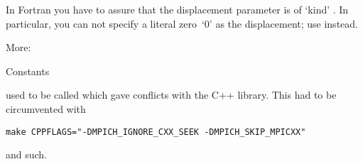 \begin{fortrannote}
  In Fortran you have to assure that the displacement parameter is of
  `kind' . In particular, you can not
  specify a literal zero~`0' as the displacement; use
   instead.
\end{fortrannote}

More:

 {Constants}

 used to be called 
which gave conflicts with the C++ library. This had to be circumvented
with
\begin{verbatim}
make CPPFLAGS="-DMPICH_IGNORE_CXX_SEEK -DMPICH_SKIP_MPICXX"
\end{verbatim}
and such.

